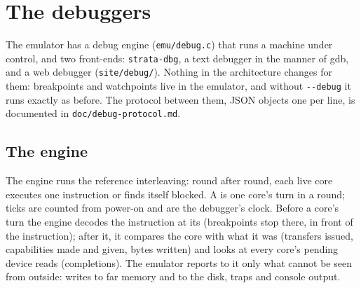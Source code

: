\section{The debuggers}\label{sec:debug}

The emulator has a debug engine (\texttt{emu/debug.c}) that runs a machine under control, and two
front-ends: \texttt{strata-dbg}, a text debugger in the manner of gdb, and a web debugger
(\texttt{site/debug/}). Nothing in the architecture changes for them: breakpoints and watchpoints live
in the emulator, and without \texttt{-{}-debug} it runs exactly as before. The protocol between them,
JSON objects one per line, is documented in \texttt{doc/debug-protocol.md}.

\subsection{The engine}
The engine runs the reference interleaving: round after round, each live core executes one instruction
or finds itself blocked. A  is one core's turn in a round; ticks are counted from power-on
and are the debugger's clock. Before a core's turn the engine decodes the instruction at its 
(breakpoints stop there, in front of the instruction); after it, it compares the core with what it was
(transfers issued, capabilities made and given, bytes written) and looks at every core's pending
device reads (completions). The emulator reports to it only what cannot be seen from outside: writes to
far memory and to the disk, traps and console output.

